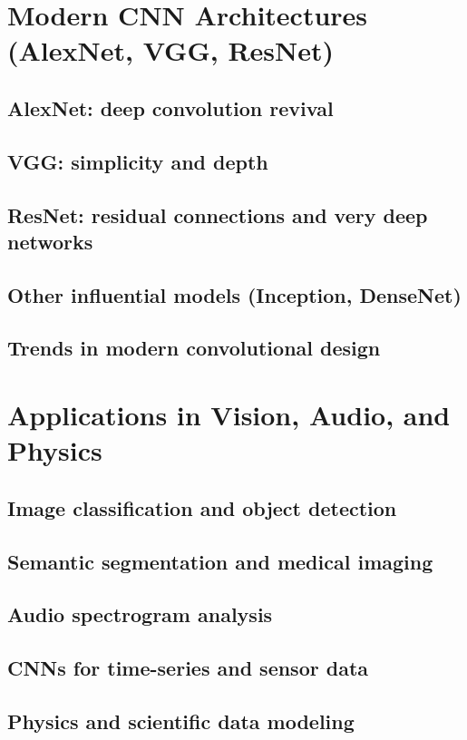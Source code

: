 \section{Modern CNN Architectures (AlexNet, VGG, ResNet)}
\subsection{AlexNet: deep convolution revival}
\subsection{VGG: simplicity and depth}
\subsection{ResNet: residual connections and very deep networks}
\subsection{Other influential models (Inception, DenseNet)}
\subsection{Trends in modern convolutional design}

\section{Applications in Vision, Audio, and Physics}
\subsection{Image classification and object detection}
\subsection{Semantic segmentation and medical imaging}
\subsection{Audio spectrogram analysis}
\subsection{CNNs for time-series and sensor data}
\subsection{Physics and scientific data modeling}

